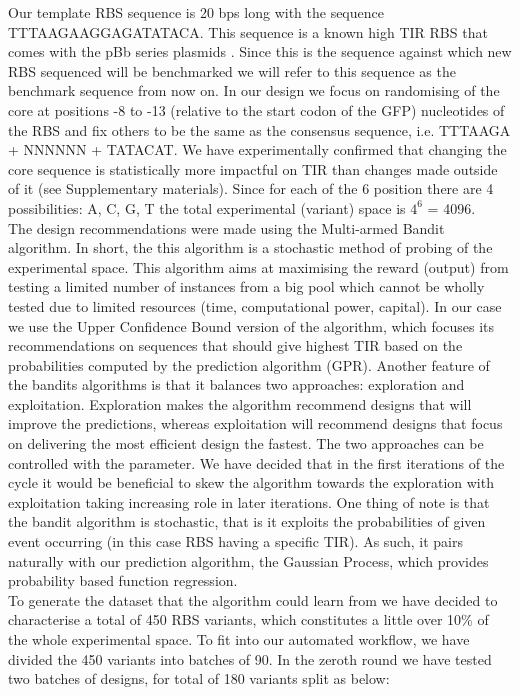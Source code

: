 \documentclass{article}
\begin{document}
Our template RBS sequence is 20 bps long with the sequence TTTAAGAAGGAGATATACA.
This sequence is a known high TIR RBS that comes with the pBb series plasmids \cite{Lee2011}. 
Since this is the sequence against which new RBS sequenced will be benchmarked we will refer to this sequence as the benchmark sequence from now on.
In our design we focus on randomising of the core at positions -8 to -13 (relative to the start codon of the GFP) nucleotides of the RBS and fix others to be the same as the consensus sequence, i.e. TTTAAGA + NNNNNN + TATACAT.
We have experimentally confirmed that changing the core sequence is statistically more impactful on TIR than changes made outside of it (see Supplementary materials). 
Since for each of the 6 position there are 4 possibilities: A, C, G, T the total experimental (variant) space is $4^6$ = 4096.\\

The design recommendations were made using the Multi-armed Bandit algorithm.
In short, the this algorithm is a stochastic method of probing of the experimental space. 
This algorithm aims at maximising the reward (output) from testing a limited number of instances from a big pool which cannot be wholly tested due to limited resources (time, computational power, capital). 
In our case we use the Upper Confidence Bound version of the algorithm, which focuses its recommendations on sequences that should give highest TIR based on the probabilities computed by the prediction algorithm (GPR). 
Another feature of the bandits algorithms is that it balances two approaches: exploration and exploitation. 
Exploration makes the algorithm recommend designs that will improve the predictions, whereas exploitation will recommend designs that focus on delivering the most efficient design the fastest. 
The two approaches can be controlled with the \textbeta\enspace parameter. 
We have decided that in the first iterations of the cycle it would be beneficial to skew the algorithm towards the exploration with exploitation taking increasing role in later iterations. 
One thing of note is that the bandit algorithm is stochastic, that is it exploits the probabilities of given event occurring (in this case RBS having a specific TIR). 
As such, it pairs naturally with our prediction algorithm, the Gaussian Process, which provides probability based function regression.
\\

To generate the dataset that the algorithm could learn from we have decided to characterise a total of 450 RBS variants, which constitutes a little over 10\% of the whole experimental space. 
To fit into our automated workflow, we have divided the 450 variants into batches of 90.
In the zeroth round we have tested two batches of designs, for total of 180 variants split as below: 
\end{document}
